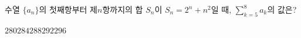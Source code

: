 \hspace*{2mm}\begin{minipage}[t]{\dimexpr\linewidth-2mm\relax}\vspace{0pt}
수열 $\{a_n\}$의 첫째항부터 제$n$항까지의 합 $S_n$이 $S_n=2^n+n^2$일 때, $\displaystyle\sum_{k=5}^{8}a_k$의 값은?
\begin{choices32}{$280$}{$284$}{$288$}{$292$}{$296$}\end{choices32}\end{minipage}

